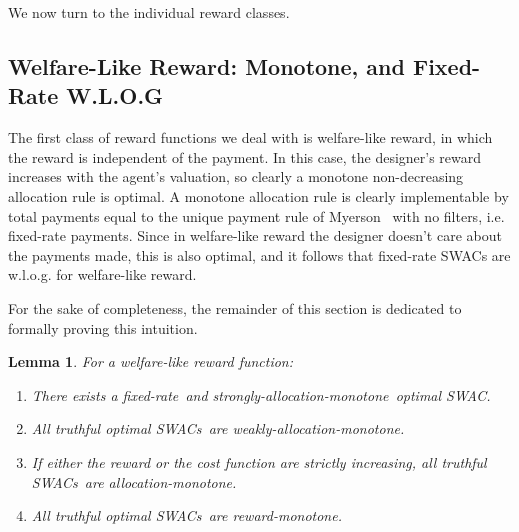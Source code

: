 \documentclass[11pt,letterpaper]{article}
\newcommand{\samono}{strongly-allocation-monotone\xspace}
\newcommand{\amono}{allocation-monotone\xspace}
\newcommand{\wamono}{weakly-allocation-monotone\xspace}
\newcommand{\rmono}{reward-monotone\xspace}
\newcommand{\fr}{fixed-rate\xspace}
\newcommand{\FR}{Fixed-Rate\xspace}
\newcommand{\swac}{SWAC\xspace}
\newcommand{\swacs}{SWACs\xspace}
\theoremstyle{plain}
\newtheorem{lemma}[theorem]{Lemma}
\begin{document}
We now turn to the individual reward classes.

\subsection{Welfare-Like Reward: Monotone, and \FR W.L.O.G}\label{sec:welfare-like-mono}

The first class of reward functions we deal with is welfare-like reward, in which the reward is independent of the payment.
In this case, the designer's reward increases with the agent's valuation, so clearly a monotone non-decreasing allocation rule is optimal. A monotone allocation rule is clearly implementable by total payments equal to the unique payment rule of Myerson~\cite{myerson1981optimal} with no filters, i.e. \fr payments. Since in welfare-like reward the designer doesn't care about the payments made, this is also optimal, and it follows that \fr \swacs are w.l.o.g. for welfare-like reward.

For the sake of completeness, the remainder of this section is dedicated to formally proving this intuition.

\begin{lemma}\label{lemma:welfare-like}
    For a welfare-like reward function:
    \begin{enumerate}
        \item There exists a \fr\ and \samono\ optimal \swac.\label{item:first}
        \item All truthful optimal \swacs\ are \wamono. \label{item:second}
        \item If either the reward or the cost function are strictly increasing, all truthful \swacs\ are \amono.\label{item:third}
        \item All truthful optimal \swacs\ are \rmono.\label{item:fourth}
    \end{enumerate}
\end{lemma}
\end{document}
